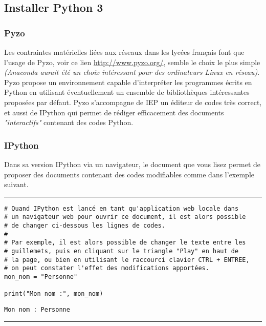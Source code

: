 \subsection{Installer Python 3}

\subsubsection{Pyzo}

Les contraintes matérielles liées aux réseaux dans les lycées français font que l'usage de Pyzo, voir ce lien \url{http://www.pyzo.org/},  semble le choix le plus simple \textit{\textit{(Anaconda aurait été un choix intéressant pour des ordinateurs Linux en réseau)}}.
Pyzo propose un environnement capable d'interpréter les programmes écrits en Python en utilisant éventuellement un ensemble de bibliothèques intéressantes proposées par défaut.
Pyzo s'accompagne de IEP un éditeur de codes très correct, et aussi de IPython qui permet de rédiger efficacement des documents \textit{"interactifs"} contenant des codes Python.


\subsubsection{IPython}

Dans sa version IPython via un navigateur, le document que vous lisez permet de proposer des documents contenant des codes modifiables comme dans l'exemple suivant.


\bigskip
{\hrule height .5mm}
\begin{verbatim}
# Quand IPython est lancé en tant qu'application web locale dans
# un navigateur web pour ouvrir ce document, il est alors possible
# de changer ci-dessous les lignes de codes.
#
# Par exemple, il est alors possible de changer le texte entre les
# guillemets, puis en cliquant sur le triangle "Play" en haut de
# la page, ou bien en utilisant le raccourci clavier CTRL + ENTREE,
# on peut constater l'effet des modifications apportées.
mon_nom = "Personne"

print("Mon nom :", mon_nom)
\end{verbatim}
 \color{ForestGreen}
\vspace{-1.5em}
\begin{verbatim}
Mon nom : Personne
\end{verbatim} \color{Black}
{\hrule height .5mm}
\bigskip